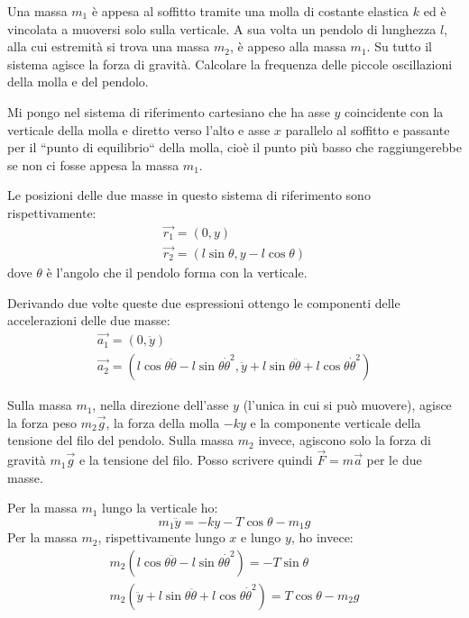 \documentclass[../main.tex]{subfiles}
\begin{document}
\textex
Una massa $m_1$ è appesa al soffitto tramite una molla di costante elastica $k$ ed è vincolata a muoversi
solo sulla verticale. A sua volta un pendolo di
lunghezza $l$, alla cui estremità si trova una massa $m_2$, è appeso alla massa $m_1$.
Su tutto il sistema agisce la forza di gravità. Calcolare la frequenza delle piccole oscillazioni della molla e
del pendolo.

\solution
Mi pongo nel sistema di riferimento cartesiano che ha asse $y$ coincidente con la verticale della molla e diretto 
verso l'alto e asse $x$ parallelo al soffitto e passante per il ``punto di equilibrio`` della molla, cioè il punto
più basso che raggiungerebbe se non ci fosse appesa la massa $m_1$.

Le posizioni delle due masse in questo sistema di riferimento sono rispettivamente:
\begin{gather*}
	\vec{r_1}=(0,y)\\
	\vec{r_2}=(l\sin\theta,y-l\cos\theta)
\end{gather*}
dove $\theta$ è l'angolo che il pendolo forma con la verticale.

Derivando due volte queste due espressioni ottengo le componenti delle accelerazioni delle due masse:
\begin{gather*}
	\vec{a_1}=(0,\ddot{y})\\
	\vec{a_2}=(l\cos\theta \ddot\theta-l\sin\theta\dot\theta^2, \ddot{y}+l\sin\theta\ddot\theta+l\cos\theta\dot\theta^2)
\end{gather*}

Sulla massa $m_1$, nella direzione dell'asse $y$ (l'unica in cui si può muovere), agisce la forza peso $m_2\vec{g}$,
la forza della molla $-ky$ e la componente verticale della tensione del filo del pendolo.
Sulla massa $m_2$ invece, agiscono solo la forza di gravità $m_1\vec{g}$ e la tensione del filo.
Posso scrivere quindi $\vec{F}=m\vec{a}$ per le due masse. 

Per la massa $m_1$ lungo la verticale ho:
\begin{equation*}
	m_1\ddot{y}=-ky-T\cos\theta-m_1g
\end{equation*}
Per la massa $m_2$, rispettivamente lungo $x$ e lungo $y$, ho invece:
\begin{gather*}
	m_2(l\cos\theta \ddot\theta-l\sin\theta\dot\theta^2)=-T\sin\theta \\
	m_2(\ddot{y}+l\sin\theta\ddot\theta+l\cos\theta\dot\theta^2)=T\cos\theta-m_2g
\end{gather*}
\end{document}
